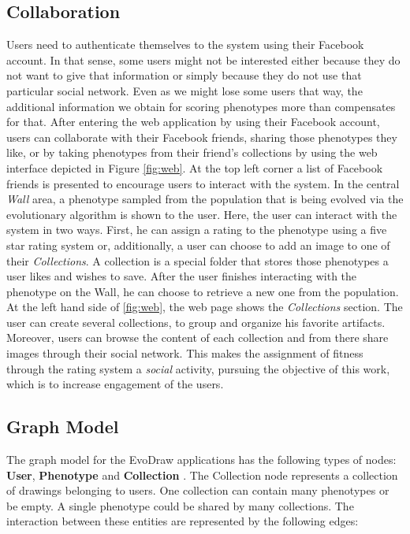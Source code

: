 \subsection{Collaboration}
\label{sec:col}
Users need to authenticate themselves to the system using their
Facebook account. In that sense, some users might not be interested
either because they do not want to give that information or simply because
they do not use that particular social network. Even as we might lose
some users that way, the additional information we obtain for scoring
phenotypes more than compensates for that. 
After entering the web application by using their Facebook account,
users can collaborate with their Facebook friends, 
sharing those phenotypes they like, or by taking phenotypes
from their friend's collections by using the web interface depicted 
in Figure \ref{fig:web}.
At the top left corner a list of Facebook friends is presented
to encourage users to interact with the system. In the central 
\emph{ Wall } area, a phenotype sampled from the population that is
being evolved via the evolutionary algorithm 
is shown to the user.
Here, the user can interact with the system in two ways.
First, he can assign a rating to the phenotype using
a five star rating system or,
additionally, a user can choose to add an image to one of their \emph{Collections}.
A collection is a special folder that stores those phenotypes a user likes and wishes
to save. After the user finishes interacting with the phenotype
on the Wall, he can choose to retrieve a new one from the population.
At the left hand side of \ref{fig:web}, the web page shows the \emph{Collections} section.
The user can create several collections, to group and organize his favorite 
artifacts. Moreover, users can browse the content of each collection and from
there share images through their social network. This makes the assignment 
of fitness through the rating system a {\em social} activity, 
pursuing the objective of this work, which is to increase engagement of the users.

\subsection{Graph Model} 
The graph model for the EvoDraw applications has the following types of
nodes: {\bf User}, {\bf Phenotype} and {\bf Collection} . The Collection node represents
a collection of drawings belonging to users. One collection can contain many phenotypes 
or be empty. A single phenotype could be shared by many collections. The interaction 
between these entities are represented by the following edges:

